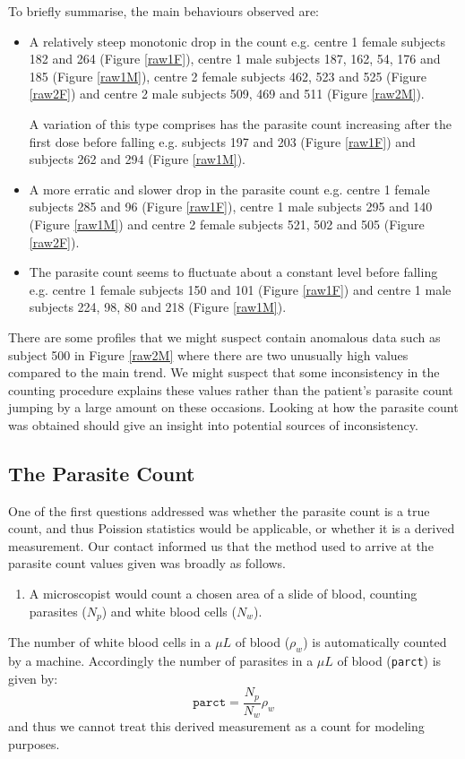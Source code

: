 \pagebreak
To briefly summarise, the main behaviours observed are:
\begin{itemize}
\item A relatively steep monotonic drop in the count e.g. centre 1 female subjects 182 and 264 (Figure \ref{raw1F}), centre 1 male subjects 187, 162, 54, 176 and 185 (Figure \ref{raw1M}), centre 2 female subjects 462, 523 and 525 (Figure \ref{raw2F}) and centre 2 male subjects 509, 469 and 511 (Figure \ref{raw2M}).

A variation of this type comprises has the parasite count increasing after the first dose before falling e.g. subjects 197 and 203 (Figure \ref{raw1F}) and subjects 262 and 294 (Figure \ref{raw1M}). 
\item A more erratic and slower drop in the parasite count e.g. centre 1 female subjects 285 and 96 (Figure \ref{raw1F}), centre 1 male subjects 295 and 140 (Figure \ref{raw1M}) and centre 2 female subjects 521, 502 and 505 (Figure \ref{raw2F}). 
\item The parasite count seems to fluctuate about a constant level before falling e.g. centre 1 female subjects 150 and 101 (Figure \ref{raw1F}) and centre 1 male subjects 224, 98, 80 and 218 (Figure \ref{raw1M}). 
\end{itemize}
There are some profiles that we might suspect contain anomalous data such as subject 500 in Figure \ref{raw2M} where there are two unusually high values compared to the main trend. We might suspect that some inconsistency in the counting procedure explains these values rather than the patient's parasite count jumping by a large amount on these occasions. Looking at how the parasite count was obtained should give an insight into potential sources of inconsistency.
\subsection{The Parasite Count}
One of the first questions addressed was whether the parasite count is a true count, and thus Poission statistics would be applicable, or whether it is a derived measurement. Our contact informed us that the method used to arrive at the parasite count values given was broadly as follows.
\begin{enumerate}
 \item A microscopist would count a chosen area of a slide of blood, counting parasites ($N_p$) and white blood cells ($N_w$).
\end{enumerate}
 The number of white blood cells in a $\mu L$ of blood ($\rho_w$) is automatically counted by a machine. Accordingly the number of parasites in a $\mu L$ of blood (\texttt{parct}) is given by:
$$\mathtt{parct}=\frac{N_p}{N_w}\rho_w$$
and thus we cannot treat this derived measurement as a count for modeling purposes.

